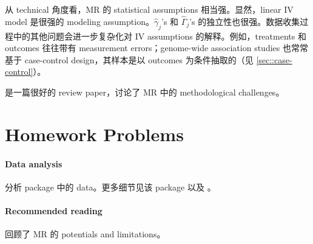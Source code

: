 从 technical 角度看，MR 的 statistical assumptions 相当强。显然，linear IV model 是很强的 modeling assumption。$\hat\gamma_j$'s 和 $\hat\Gamma_j$'s 的独立性也很强。数据收集过程中的其他问题会进一步复杂化对 IV assumptions 的解释。例如，treatments 和 outcomes 往往带有 measurement errors；genome-wide association studies 也常常基于 case-control design，其样本是以 outcomes 为条件抽取的（见 \cref{sec::case-control}）。

 
\citet{vanderweele2014methodological} 是一篇很好的 review paper，讨论了 MR 中的 methodological challenges。

 
 
\section{Homework Problems}

\paragraph{Data analysis}\label{para::data-bmi-bmi}
分析  package  中的  data。更多细节见该 package 以及 \citet[][Section 7.2]{zhao2020statistical}。


 
 \paragraph{Recommended reading}

\citet{davey2003mendelian} 回顾了 MR 的 potentials and limitations。


